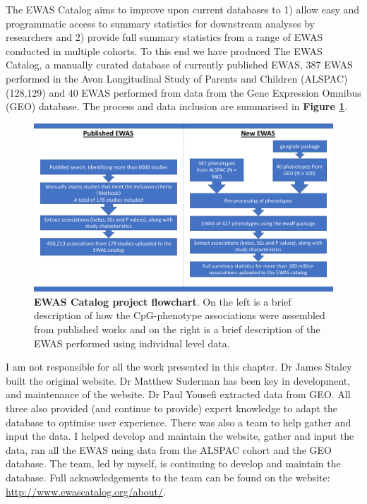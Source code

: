 \documentclass[11pt,oneside]{bristolthesis}
\begin{document}
The EWAS Catalog aims to improve upon current databases to 1) allow easy and programmatic access to summary statistics for downstream analyses by researchers and 2) provide full summary statistics from a range of EWAS conducted in multiple cohorts. To this end we have produced The EWAS Catalog, a manually curated database of currently published EWAS, 387 EWAS performed in the Avon Longitudinal Study of Parents and Children (ALSPAC) (128,129) and 40 EWAS performed from data from the Gene Expression Omnibus (GEO) database. The process and data inclusion are summarised in \textbf{Figure \ref{fig:catalog-project-workflow}}.




\begin{figure}

{\centering \includegraphics[width=1\linewidth]{figure/03-ewas_catalog/project_flowchart} 

}

\caption[EWAS Catalog project flowchart]{\textbf{EWAS Catalog project flowchart}. On the left is a brief description of how the CpG-phenotype associations were assembled from published works and on the right is a brief description of the EWAS performed using individual level data.}\label{fig:catalog-project-workflow}
\end{figure}
I am not responsible for all the work presented in this chapter. Dr James Staley built the original website. Dr Matthew Suderman has been key in development, and maintenance of the website. Dr Paul Yousefi extracted data from GEO. All three also provided (and continue to provide) expert knowledge to adapt the database to optimise user experience. There was also a team to help gather and input the data. I helped develop and maintain the website, gather and input the data, ran all the EWAS using data from the ALSPAC cohort and the GEO database. The team, led by myself, is continuing to develop and maintain the database. Full acknowledgements to the team can be found on the website: \url{http://www.ewascatalog.org/about/}.
\end{document}
